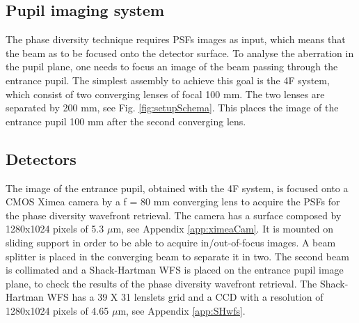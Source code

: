 \subsection{Pupil imaging system}
\label{subsec:pupilImSystem}

The phase diversity technique requires PSFs images as input, which means that the beam as to be focused onto the detector surface. To analyse the aberration in the pupil plane, one needs to focus an image of the beam passing through the entrance pupil. The simplest assembly to achieve this goal is the 4F system, which consist of two converging lenses of focal 100 mm. The two lenses are separated by 200 mm, see Fig. \ref{fig:setupSchema}. This places the image of the entrance pupil 100 mm after the second converging lens.

\subsection{Detectors}
\label{subsec:Detectors}

The image of the entrance pupil, obtained with the 4F system, is focused onto a CMOS Ximea camera by a f = 80 mm converging lens to acquire the PSFs for the phase diversity wavefront retrieval. The camera has a surface composed by 1280x1024 pixels of 5.3 $\mu$m, see Appendix \ref{app:ximeaCam}. It is mounted on sliding support in order to be able to acquire in/out-of-focus images. A beam splitter is placed in the converging beam to separate it in two. The second beam is collimated and a Shack-Hartman WFS is placed on the entrance pupil image plane, to check the results of the phase diversity wavefront retrieval. The Shack-Hartman WFS has a 39 X 31 lenslets grid and a CCD with a resolution of 1280x1024 pixels of 4.65 $\mu$m, see Appendix \ref{app:SHwfs}. 

